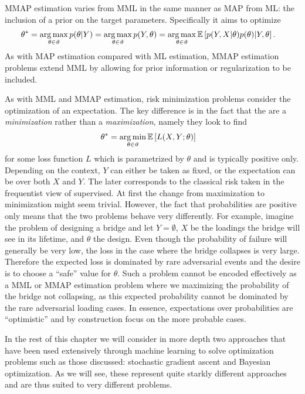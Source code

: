 MMAP estimation varies from MML in the same manner as MAP from ML: the inclusion
of a prior on the target parameters.  Specifically it aims to optimize
\begin{align}
\label{eq:opt:MMAP}
\theta^* &= \operatorname*{arg\,max}_{\theta \in \vartheta} p(\theta | Y)  = \operatorname*{arg\,max}_{\theta \in \vartheta} p(Y,\theta) 
= \operatorname*{arg\,max}_{\theta \in \vartheta} \mathbb{E} \left[p(Y,X|\theta) p(\theta) | Y, \theta\right].
\end{align}
As with MAP estimation compared with ML estimation, 
MMAP estimation problems extend MML by allowing for prior information or regularization to be
included.

As with MML and MMAP estimation, risk minimization problems consider the optimization
of an expectation.  The key difference is in the fact that the are a \textit{minimization} rather
than a \textit{maximization}, namely they look to find
\begin{align}
\label{eq:opt:riskmin}
\theta^* &= \operatorname*{arg\,min}_{\theta \in \vartheta}  \mathbb{E} \left[L(X,Y;\theta)\right]
\end{align}
for some loss function $L$ which is parametrized by $\theta$ and is typically positive only.
Depending on the context, $Y$ can either be taken as fixed, or the expectation can be over
both $X$ and $Y$.  The later corresponds to the classical risk taken in the frequentist view
of supervised.
At first the change from
maximization to minimization might seem trivial.  However,
the fact that probabilities are positive only means that the two problems behave very
differently.  For example, imagine the problem of designing a bridge and let 
$Y=\emptyset$, $X$ be the loadings the bridge will see in its lifetime, and $\theta$
the design.  Even though the probability of failure will generally be very low, the
loss in the case where the bridge collapses is very large.  Therefore the expected loss
is dominated by rare adversarial events and the desire is to choose a ``safe'' value for
$\theta$.  Such a problem cannot be encoded effectively as a MML or MMAP estimation
problem where we maximizing the probability of the bridge not collapsing,
as this expected probability cannot be dominated by the rare adversarial loading cases.
In essence, expectations over probabilities are ``optimistic'' and by construction
focus on the more probable cases.

In the rest of this chapter we will consider in more depth two approaches that have been used
extensively through machine learning to solve optimization problems such as those 
discussed: stochastic gradient ascent and Bayesian optimization.  As we will see, these
represent quite starkly different approaches and are thus suited to very different problems.